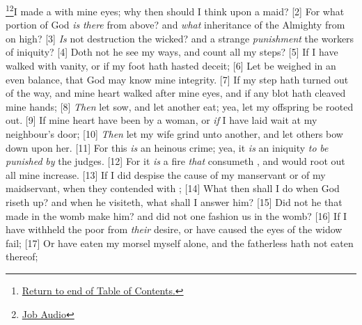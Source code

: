 \footnote{\textcolor[cmyk]{0.99998,1,0,0}{\hyperlink{TOC}{Return to end of Table of Contents.}}}\footnote{\href{https://www.audioverse.org/english/audiobibles/books/ENGKJV/O/Job/1}{\textcolor[cmyk]{0.99998,1,0,0}{Job  Audio}}}\textcolor[cmyk]{0.99998,1,0,0}{I made a  with mine eyes; why then should I think upon a maid?}
[2] \textcolor[cmyk]{0.99998,1,0,0}{For what portion of God \emph{is} \emph{there} from above? and \emph{what} inheritance of the Almighty from on high?}
[3] \textcolor[cmyk]{0.99998,1,0,0}{\emph{Is} not destruction   the wicked? and a strange \emph{punishment}   the workers of iniquity?}
[4] \textcolor[cmyk]{0.99998,1,0,0}{Doth not he see my ways, and count all my steps?}
[5] \textcolor[cmyk]{0.99998,1,0,0}{If I have walked with vanity, or if my foot hath hasted   deceit;}
[6] \textcolor[cmyk]{0.99998,1,0,0}{Let   be weighed in an even balance, that God may know mine integrity.}
[7] \textcolor[cmyk]{0.99998,1,0,0}{If my step hath turned out of the way, and mine heart walked after mine eyes, and if any blot hath cleaved   mine hands;}
[8] \textcolor[cmyk]{0.99998,1,0,0}{\emph{Then} let   sow, and let another eat; yea, let my offspring be rooted out.}
[9] \textcolor[cmyk]{0.99998,1,0,0}{If mine heart have been  by a woman, or \emph{if} I have laid wait at my neighbour's door;}
[10] \textcolor[cmyk]{0.99998,1,0,0}{\emph{Then} let my wife grind unto another, and let others bow down upon her.}
[11] \textcolor[cmyk]{0.99998,1,0,0}{For this \emph{is} an heinous crime; yea, it \emph{is} an iniquity \emph{to} \emph{be} \emph{punished} \emph{by} the judges.}
[12] \textcolor[cmyk]{0.99998,1,0,0}{For it \emph{is} a fire \emph{that} consumeth   , and would root out all mine increase.}
[13] \textcolor[cmyk]{0.99998,1,0,0}{If I did despise the cause of my manservant or of my maidservant, when they contended with  ;}
[14] \textcolor[cmyk]{0.99998,1,0,0}{What then shall I do when God riseth up? and when he visiteth, what shall I answer him?}
[15] \textcolor[cmyk]{0.99998,1,0,0}{Did not he that made   in the womb make him? and did not one fashion us in the womb?}
[16] \textcolor[cmyk]{0.99998,1,0,0}{If I have withheld the poor from \emph{their} desire, or have caused the eyes of the widow   fail;}
[17] \textcolor[cmyk]{0.99998,1,0,0}{Or have eaten my morsel myself alone, and the fatherless hath not eaten thereof;}
